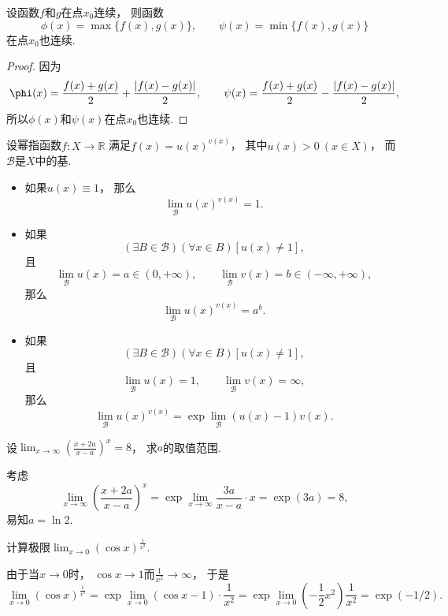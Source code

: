 \begin{proposition}
设函数\(f\)和\(g\)在点\(x_0\)连续，
则函数\[
	\phi(x) = \max\{f(x),g(x)\}, \qquad
	\psi(x) = \min\{f(x),g(x)\}
\]在点\(x_0\)也连续.
\begin{proof}
因为\[
	\phi(x)
	= \frac{f(x)+g(x)}{2}+\frac{\abs{f(x)-g(x)}}{2}, \qquad
	\psi(x)
	= \frac{f(x)+g(x)}{2}-\frac{\abs{f(x)-g(x)}}{2},
\]
所以\(\phi(x)\)和\(\psi(x)\)在点\(x_0\)也连续.
\end{proof}
\end{proposition}

\begin{proposition}\label{theorem:幂指函数.幂指函数的极限}
设幂指函数\(f\colon X\to\mathbb{R}\)
满足\(f(x) = u(x)^{v(x)}\)，
其中\(u(x)>0\ (x \in X)\)，
而\(\mathcal{B}\)是\(X\)中的基.
\begin{itemize}
	\item 如果\(u(x) \equiv 1\)，
	那么\[
		\lim_\mathcal{B} u(x)^{v(x)} = 1.
	\]

	\item 如果\[
		(\exists B\in\mathcal{B})
		(\forall x \in B)
		[u(x)\neq1],
	\]且\[
		\lim_\mathcal{B} u(x) = a \in (0,+\infty), \qquad
		\lim_\mathcal{B} v(x) = b \in (-\infty,+\infty),
	\]
	那么\[
		\lim_\mathcal{B} u(x)^{v(x)} = a^b.
	\]

	\item 如果\[
		(\exists B\in\mathcal{B})
		(\forall x \in B)
		[u(x)\neq1],
	\]且\[
		\lim_\mathcal{B} u(x) = 1, \qquad
		\lim_\mathcal{B} v(x) = \infty,
	\]
	那么\[
		\lim_\mathcal{B} u(x)^{v(x)}
		= \exp\lim_\mathcal{B} (u(x)-1) v(x).
	\]
\end{itemize}
\end{proposition}

\begin{example}
设\(\lim_{x\to\infty} \left( \frac{x+2a}{x-a} \right)^x = 8\)，
求\(a\)的取值范围.
\begin{solution}
考虑\[
	\lim_{x\to\infty} \left( \frac{x+2a}{x-a} \right)^x
	= \exp\lim_{x\to\infty} \frac{3a}{x-a} \cdot x
	= \exp(3a)
	= 8,
\]
易知\(a = \ln2\).
\end{solution}
\end{example}

\begin{example}
计算极限\(\lim_{x\to0} (\cos x)^{\frac1{x^2}}\).
\begin{solution}
由于当\(x\to0\)时，
\(\cos x \to 1\)而\(\frac1{x^2} \to \infty\)，
于是\[
	\lim_{x\to0} (\cos x)^{\frac1{x^2}}
	= \exp\lim_{x\to0} (\cos x - 1) \cdot \frac1{x^2}
	= \exp\lim_{x\to0} \left( -\frac12 x^2 \right) \frac1{x^2}
	= \exp(-1/2).
\]
\end{solution}
\end{example}

